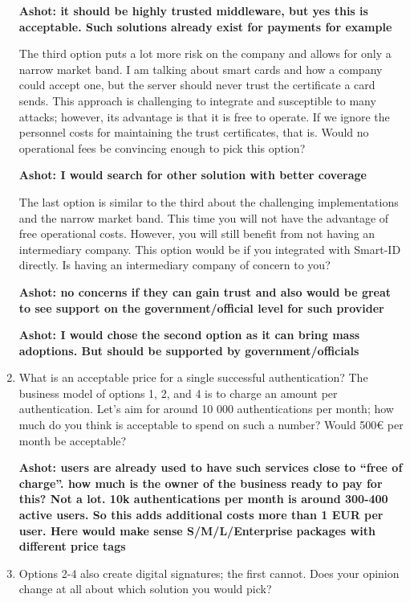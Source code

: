 \begin{enumerate}
    \textbf{Ashot: it should be highly trusted middleware, but yes this is acceptable. Such solutions already exist for payments for example}

    The third option puts a lot more risk on the company and allows for only a narrow market band. I am talking about smart cards and how a company could accept one, but the server should never trust the certificate a card sends. This approach is challenging to integrate and susceptible to many attacks; however, its advantage is that it is free to operate. If we ignore the personnel costs for maintaining the trust certificates, that is. Would no operational fees be convincing enough to pick this option?

    \textbf{Ashot: I would search for other solution with better coverage}

    The last option is similar to the third about the challenging implementations and the narrow market band. This time you will not have the advantage of free operational costs. However, you will still benefit from not having an intermediary company. This option would be if you integrated with Smart-ID directly. Is having an intermediary company of concern to you?

    \textbf{Ashot: no concerns if they can gain trust and also would be great to see support on the government/official level for such provider}

    \textbf{Ashot: I would chose the second option as it can bring mass adoptions. But should be supported by government/officials}

    \item What is an acceptable price for a single successful authentication? The business model of options 1, 2, and 4 is to charge an amount per authentication. Let's aim for around 10 000 authentications per month; how much do you think is acceptable to spend on such a number? Would 500€ per month be acceptable?
    
    \textbf{Ashot: users are already used to have such services close to “free of charge”. how much is the owner of the business ready to pay for this? Not a lot. 10k authentications per month is around 300-400 active users. So this adds additional costs more than 1 EUR per user.
    Here would make sense S/M/L/Enterprise packages with different price tags}
    \item Options 2-4 also create digital signatures; the first cannot. Does your opinion change at all about which solution you would pick?
    

\end{enumerate}
